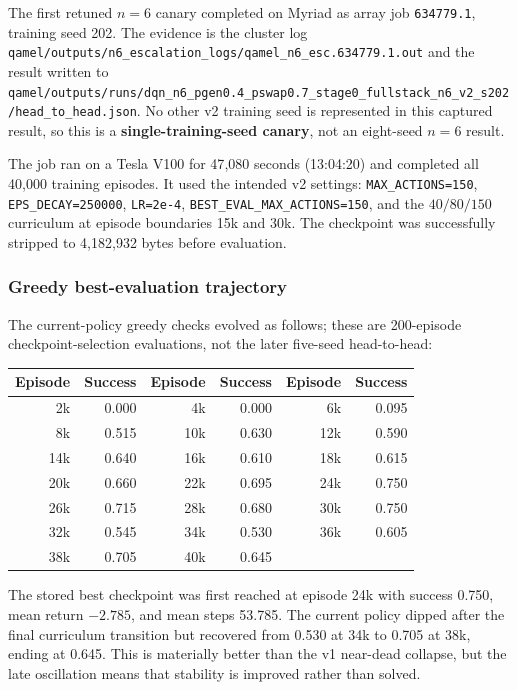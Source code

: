 \documentclass[11pt]{article}
\newcommand{\code}[1]{\texttt{#1}}
\newcommand{\file}[1]{\texttt{\small #1}}
\begin{document}
The first retuned $n=6$ canary completed on Myriad as array job
\code{634779.1}, training seed 202. The evidence is the cluster log
\file{qamel/outputs/n6\_escalation\_logs/qamel\_n6\_esc.634779.1.out} and the
result written to
\file{qamel/outputs/runs/dqn\_n6\_pgen0.4\_pswap0.7\_stage0\_fullstack\_n6\_v2\_s202/head\_to\_head.json}.
No other v2 training seed is represented in this captured result, so this is a
\textbf{single-training-seed canary}, not an eight-seed $n=6$ result.

The job ran on a Tesla V100 for 47{,}080 seconds (13:04:20) and completed all
40{,}000 training episodes. It used the intended v2 settings:
\code{MAX\_ACTIONS=150}, \code{EPS\_DECAY=250000},
\code{LR=2e-4}, \code{BEST\_EVAL\_MAX\_ACTIONS=150}, and the
$40/80/150$ curriculum at episode boundaries 15k and 30k. The checkpoint was
successfully stripped to 4{,}182{,}932 bytes before evaluation.

\subsubsection*{Greedy best-evaluation trajectory}

The current-policy greedy checks evolved as follows; these are 200-episode
checkpoint-selection evaluations, not the later five-seed head-to-head:

\begin{center}
\small
\begin{tabular}{rrrrrr}
\toprule
Episode & Success & Episode & Success & Episode & Success \\
\midrule
2k  & 0.000 & 4k  & 0.000 & 6k  & 0.095 \\
8k  & 0.515 & 10k & 0.630 & 12k & 0.590 \\
14k & 0.640 & 16k & 0.610 & 18k & 0.615 \\
20k & 0.660 & 22k & 0.695 & 24k & 0.750 \\
26k & 0.715 & 28k & 0.680 & 30k & 0.750 \\
32k & 0.545 & 34k & 0.530 & 36k & 0.605 \\
38k & 0.705 & 40k & 0.645 &     &       \\
\bottomrule
\end{tabular}
\end{center}

The stored best checkpoint was first reached at episode 24k with success 0.750,
mean return $-2.785$, and mean steps 53.785. The current policy dipped after the
final curriculum transition but recovered from 0.530 at 34k to 0.705 at 38k,
ending at 0.645. This is materially better than the v1 near-dead collapse, but
the late oscillation means that stability is improved rather than solved.
\end{document}
